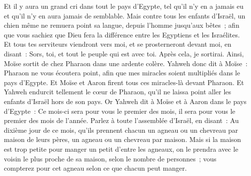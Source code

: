 \begin{multicols}{2}
Et il y aura un grand cri dans tout le pays d'Egypte, tel qu'il n'y en a jamais eu et qu'il n'y en aura jamais de semblable.
Mais contre tous les enfants d'Israël, un chien même ne remuera point sa langue, depuis l'homme jusqu'aux bêtes~; afin que vous sachiez que Dieu fera la différence entre les Egyptiens et les Israélites.
Et tous tes serviteurs viendront vers moi, et se prosterneront devant moi, en disant~: Sors, toi, et tout le peuple qui est avec toi. Après cela, je sortirai. Ainsi, Moïse sortit de chez Pharaon dans une ardente colère.
Yahweh donc dit à Moïse~: Pharaon ne vous écoutera point, afin que mes miracles soient multipliés dans le pays d'Egypte.
Et Moïse et Aaron firent tous ces miracles-là devant Pharaon. Et Yahweh endurcit tellement le cœur de Pharaon, qu'il ne laissa point aller les enfants d'Israël hors de son pays.
\VerseOne{}Or Yahweh dit à Moïse et à Aaron dans le pays d'Egypte~:
Ce mois-ci sera pour vous le premier des mois, il sera pour vous le premier des mois de l'année.
Parlez à toute l'assemblée d'Israël, en disant~: Au dixième jour de ce mois, qu'ils prennent chacun un agneau ou un chevreau par maison de leurs pères, un agneau ou un chevreau par maison.
Mais si la maison est trop petite pour manger un petit d'entre les agneaux, on le prendra avec le voisin le plus proche de sa maison, selon le nombre de personnes~; vous compterez pour cet agneau selon ce que chacun peut manger.

\end{multicols}
